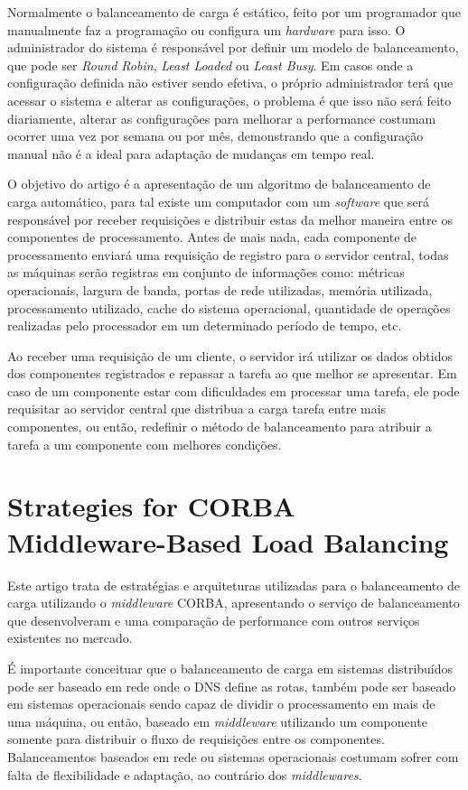 	Normalmente o balanceamento de carga é estático, feito por um programador que manualmente faz a programação ou configura um \textit{hardware} para isso. O administrador do sistema é responsável por definir um modelo de balanceamento, que pode ser \textit{Round Robin}, \textit{Least Loaded} ou \textit{Least Busy}. Em casos onde a configuração definida não estiver sendo efetiva, o próprio administrador terá que acessar o sistema e alterar as configurações, o problema é que isso não será feito diariamente, alterar as configurações para melhorar a performance costumam ocorrer uma vez por semana ou por mês, demonstrando que a configuração manual não é a ideal para adaptação de mudanças em tempo real.
	
	O objetivo do artigo é a apresentação de um algoritmo de balanceamento de carga automático, para tal existe um computador com um \textit{software} que será responsável por receber requisições e distribuir estas da melhor maneira entre os componentes de processamento. Antes de mais nada, cada componente de processamento enviará uma requisição de registro para o servidor central, todas as máquinas serão registras em conjunto de informações como: métricas operacionais, largura de banda, portas de rede utilizadas, memória utilizada, processamento utilizado, cache do sistema operacional, quantidade de operações realizadas pelo processador em um determinado período de tempo, etc.
	
	Ao receber uma requisição de um cliente, o servidor irá utilizar os dados obtidos dos componentes registrados e repassar a tarefa ao que melhor se apresentar. Em caso de um componente estar com dificuldades em processar uma tarefa, ele pode requisitar ao servidor central que distribua a carga tarefa entre mais componentes, ou então, redefinir o método de balanceamento para atribuir a tarefa a um componente com melhores condições.
	
\section{Strategies for CORBA Middleware-Based Load Balancing}
	Este artigo trata de estratégias e arquiteturas utilizadas para o balanceamento de carga utilizando o \textit{middleware} CORBA, apresentando o serviço de balanceamento que desenvolveram e uma comparação de performance com outros serviços existentes no mercado.
	
	É importante conceituar que o balanceamento de carga em sistemas distribuídos pode ser baseado em rede onde o DNS define as rotas, também pode ser baseado em sistemas operacionais sendo capaz de dividir o processamento em mais de uma máquina, ou então, baseado em \textit{middleware} utilizando um componente somente para distribuir o fluxo de requisições entre os componentes. Balanceamentos baseados em rede ou sistemas operacionais costumam sofrer com falta de flexibilidade e adaptação, ao contrário dos \textit{middlewares}.
	
